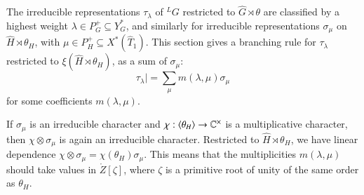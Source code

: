 The irreducible representations $\tau_\lambda$ of ${}^LG$ restricted
to $\hat G\rtimes\theta$ are classified by a highest weight
$\lambda\in P^+_G\subseteq Y^*_G$, and similarly for irreducible
representations $\sigma_\mu$ on $\hat H\rtimes \theta_H$, with $\mu\in
P^+_H\subseteq X^*(\hat T_1)$.
This section gives a branching rule for $\tau_\lambda$ restricted to
$\xi(\hat H\rtimes\theta_H)$, as a sum of $\sigma_\mu$:
\[
\tau_\lambda| = \sum_\mu m(\lambda,\mu) \sigma_\mu
\]
for some coefficients $m(\lambda,\mu)$.  

If $\sigma_\mu$ is an irreducible character and
$\chi:\langle{\theta_H}\rangle\to \mathbb{C}^\times$ is a multiplicative
character, then $ \chi\otimes\sigma_\mu$ is again an irreducible
character.  Restricted to $\hat H\rtimes\theta_H$, we have linear
dependence $\chi\otimes\sigma_\mu = \chi(\theta_H) \sigma_\mu $.  This
means that the multiplicities $m(\lambda,\mu)$ should take values in
$\ring{Z}[\zeta]$, where $\zeta$ is a primitive root of unity of the
same order as $\theta_H$.

